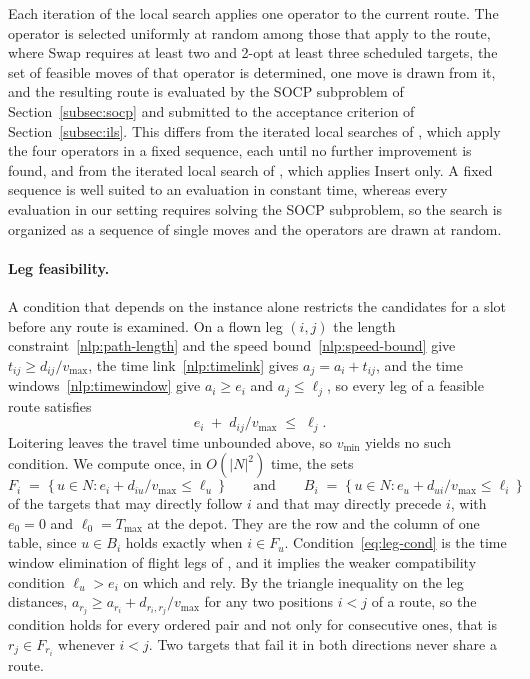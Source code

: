 Each iteration of the local search applies one operator to the current route. The operator is selected uniformly at random among those that apply to the route, where Swap requires at least two and 2-opt at least three scheduled targets, the set of feasible moves of that operator is determined, one move is drawn from it, and the resulting route is evaluated by the SOCP subproblem of Section~\ref{subsec:socp} and submitted to the acceptance criterion of Section~\ref{subsec:ils}. This differs from the iterated local searches of \citep{gunawan2015iterated, gunawan2017well}, which apply the four operators in a fixed sequence, each until no further improvement is found, and from the iterated local search of \citep{vansteenwegen2009iterated}, which applies Insert only. A fixed sequence is well suited to an evaluation in constant time, whereas every evaluation in our setting requires solving the SOCP subproblem, so the search is organized as a sequence of single moves and the operators are drawn at random.

\paragraph{Leg feasibility.}
A condition that depends on the instance alone restricts the candidates for a slot before any route is examined. On a flown leg $(i,j)$ the length constraint~\eqref{nlp:path-length} and the speed bound~\eqref{nlp:speed-bound} give $t_{ij} \ge d_{ij}/v_{\max}$, the time link~\eqref{nlp:timelink} gives $a_j = a_i + t_{ij}$, and the time windows~\eqref{nlp:timewindow} give $a_i \ge e_i$ and $a_j \le \ell_j$, so every leg of a feasible route satisfies
\begin{equation}\label{eq:leg-cond}
    e_i \;+\; d_{ij} / v_{\max} \;\le\; \ell_j .
\end{equation}
Loitering leaves the travel time unbounded above, so $v_{\min}$ yields no such condition. We compute once, in $O(|N|^2)$ time, the sets
\begin{equation}\label{eq:fb-sets}
    F_i \;=\; \{\, u \in N : e_i + d_{iu}/v_{\max} \le \ell_u \,\}
    \qquad \text{and} \qquad
    B_i \;=\; \{\, u \in N : e_u + d_{ui}/v_{\max} \le \ell_i \,\}
\end{equation}
of the targets that may directly follow $i$ and that may directly precede $i$, with $e_0 = 0$ and $\ell_0 = T_{\max}$ at the depot. They are the row and the column of one table, since $u \in B_i$ holds exactly when $i \in F_u$. Condition~\eqref{eq:leg-cond} is the time window elimination of flight legs of \citep{desrochers1991improvements}, and it implies the weaker compatibility condition $\ell_u > e_i$ on which \citep{vansteenwegen2009iterated} and \citep{gunawan2015iterated} rely. By the triangle inequality on the leg distances, $a_{r_j} \ge a_{r_i} + d_{r_i, r_j}/v_{\max}$ for any two positions $i < j$ of a route, so the condition holds for every ordered pair and not only for consecutive ones, that is $r_j \in F_{r_i}$ whenever $i < j$. Two targets that fail it in both directions never share a route.

